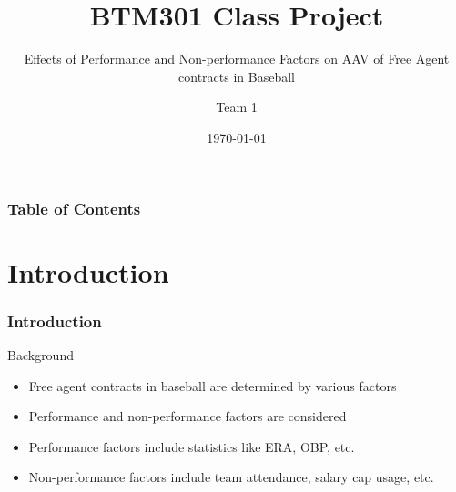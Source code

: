 \documentclass[9pt]{beamer}
\subtitle{Effects of Performance and Non-performance Factors on AAV of Free Agent contracts in Baseball}
\title{BTM301 Class Project}
\author{Team 1}
\institute{KAIST}
\date{\today}
\begin{document}
\begin{frame}
    \titlepage
\end{frame}
\begin{frame}
    \frametitle{Table of Contents}
    \tableofcontents
\end{frame}

\section{Introduction}
\begin{frame}
    \frametitle{Introduction}
    \begin{block}{Background}
        \begin{itemize}
            \item Free agent contracts in baseball are determined by various factors
            \item Performance and non-performance factors are considered
            \item Performance factors include statistics like ERA, OBP, etc.
            \item Non-performance factors include team attendance, salary cap usage, etc.
        \end{itemize}
        
    \end{block}
\end{frame}
\end{document}
